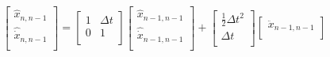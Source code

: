 \documentclass[eng]{ajceam-class}
\begin{document}
$$
\left[\begin{array}{c}
\hat{x}_{n, n-1} \\
\hat{\dot{x}}_{n, n-1} \\
\end{array}\right]=\left[\begin{array}{ccccccccc}
1 &  \Delta t \\
0 & 1  \\
\end{array}\right]\left[\begin{array}{l}
\hat{x}_{n-1, n-1} \\
\hat{\dot{x}}_{n-1, n-1} \\
\end{array}\right]+\left[\begin{array}{ccccccccc}
\frac{1}{2}\Delta t^2 \\
\Delta t  \\
\end{array}\right]\left[\begin{array}{l}
{\ddot{x}}_{n-1, n-1} \\
\end{array}\right]
$$
\end{document}
